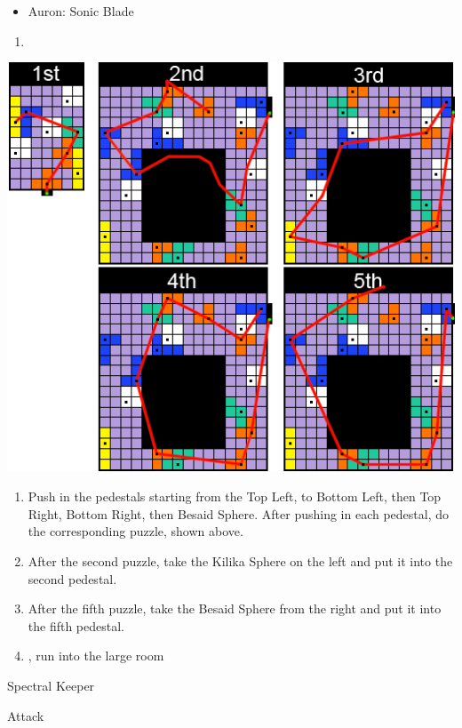 \begin{equip}
	\begin{itemize}
		\item Auron: Sonic Blade
	\end{itemize}
\end{equip}
\begin{enumerate}[resume]
	\item {\large \save}
\end{enumerate}
\includegraphics[width=.95\columnwidth]{graphics/Zanarkand_Trials}
\begin{enumerate}[resume]
	\item Push in the pedestals starting from the Top Left, to Bottom Left, then Top Right, Bottom Right, then Besaid Sphere. After pushing in each pedestal, do the corresponding puzzle, shown above.
	\item After the second puzzle, take the Kilika Sphere on the left and put it into the second pedestal.
	\item After the fifth puzzle, take the Besaid Sphere from the right and put it into the fifth pedestal.
	\item \cs, run into the large room
\end{enumerate}
\begin{battle}[52000]{Spectral Keeper}
	\begin{itemize}
		\summon{\bahamut}
		\bahamutf Attack
	\end{itemize}
\end{battle}
